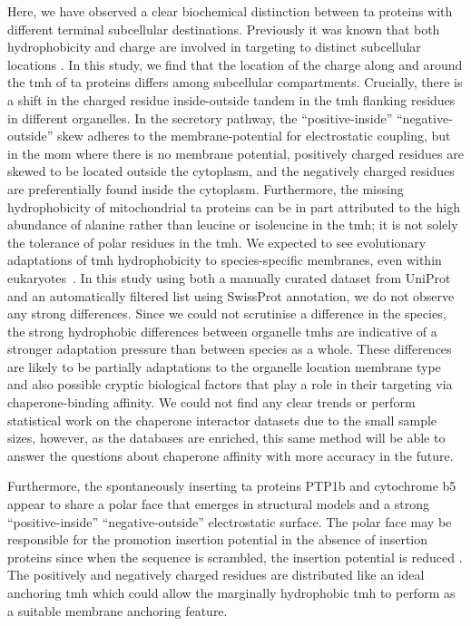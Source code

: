 Here, we have observed a clear biochemical distinction between \gls{ta} proteins with different terminal subcellular destinations.
Previously it was known that both hydrophobicity and charge are involved in targeting to distinct subcellular locations \cite{Costello2017}.
In this study, we find that the location of the charge along and around the \gls{tmh} of \gls{ta} proteins differs among subcellular compartments.
Crucially, there is a shift in the charged residue inside\--outside tandem in the \gls{tmh} flanking residues in different organelles.
In the secretory pathway, the ``positive\--inside'' ``negative\--outside'' skew adheres to the membrane\--potential for electrostatic coupling, but in the \gls{mom} where there is no membrane potential, positively charged residues are skewed to be located outside the cytoplasm, and the negatively charged residues are preferentially found inside the cytoplasm.
Furthermore, the missing hydrophobicity of mitochondrial \gls{ta} proteins can be in part attributed to the high abundance of alanine rather than leucine or isoleucine in the \gls{tmh}; it is not solely the tolerance of polar residues in the \gls{tmh}.
We expected to see evolutionary adaptations of \gls{tmh} hydrophobicity to species-specific membranes, even within eukaryotes~\cite{Baker2017, Sharpe2010}.
In this study using both a manually curated dataset from UniProt and an automatically filtered list using SwissProt annotation, we do not observe any strong differences.
Since we could not scrutinise a difference in the species, the strong hydrophobic differences between organelle \gls{tmh}s are indicative of a stronger adaptation pressure than between species as a whole.
These differences are likely to be partially adaptations to the organelle location membrane type and also possible cryptic biological factors that play a role in their targeting via chaperone\--binding affinity.
We could not find any clear trends or perform statistical work on the chaperone interactor datasets due to the small sample sizes, however, as the databases are enriched, this same method will be able to answer the questions about chaperone affinity with more accuracy in the future.

Furthermore, the spontaneously inserting \gls{ta} proteins PTP1b and cytochrome b5 appear to share a polar face that emerges in structural models and a strong ``positive\--inside'' ``negative\--outside'' electrostatic surface.
The polar face may be responsible for the promotion insertion potential in the absence of insertion proteins since when the sequence is scrambled, the insertion potential is reduced \cite{Brambillasca2006}.
The positively and negatively charged residues are distributed like an ideal anchoring \gls{tmh} \cite{Baker2017} which could allow the marginally hydrophobic \gls{tmh} to perform as a suitable membrane anchoring feature.


